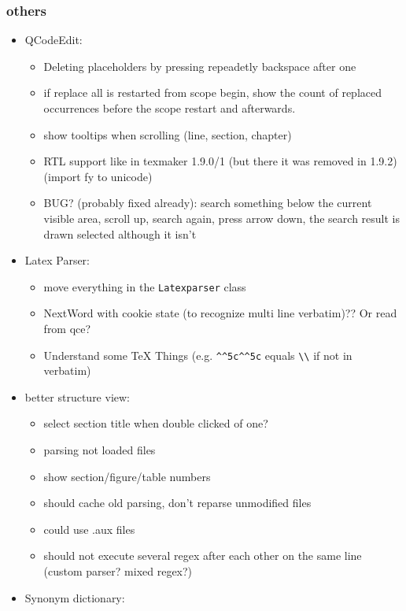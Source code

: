 \documentclass[10pt,a4paper,landscape]{report}
\begin{document}
\subsubsection{others}
\begin{itemize}
	\item QCodeEdit: \begin{itemize}
		\item Deleting placeholders by pressing repeadetly backspace after one
		\item if replace all is restarted from scope begin, show the count of replaced occurrences before the scope restart and afterwards.
		\item show tooltips when scrolling (line, section, chapter)
		\item RTL support like in texmaker 1.9.0/1 (but there it was removed in 1.9.2) (import fy to unicode)
		\item BUG? (probably fixed already): 
		search something below the current visible area, scroll up, search again, press arrow down, the search result is drawn selected although it isn't
	\end{itemize}
	\item Latex Parser: \begin{itemize}
		\item move everything in the \verb+Latexparser+ class
		\item NextWord with cookie state (to recognize multi line verbatim)?? Or read from qce?
		\item Understand some TeX Things (e.g. \verb+^^5c^^5c+ equals \verb+\\+ if not in verbatim)
	\end{itemize}
	\item better structure view: \begin{itemize}
		\item select section title when double clicked of one?		
		\item parsing not loaded files
		\item show section/figure/table numbers
		\item should cache old parsing, don't reparse unmodified files
		\item could use .aux files
		\item should not execute several regex after each other on the same line (custom parser? mixed regex?)	
	\end{itemize}
	\item Synonym dictionary: \begin{itemize}

\end{itemize}
\end{itemize}
\end{document}
